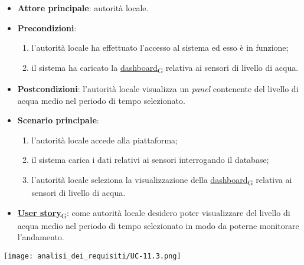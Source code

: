 \begin{itemize}
	\item \textbf{Attore principale}: autorità locale.
	\item \textbf{Precondizioni}:
	      \begin{enumerate}
		      \item l'autorità locale ha effettuato l'accesso al sistema ed esso è in funzione;
		      \item il sistema ha caricato la \href{https://7last.github.io/docs/rtb/documentazione-interna/glossario\#dashboard}{dashboard\textsubscript{G}} relativa ai sensori di livello di acqua.
	      \end{enumerate}
	\item \textbf{Postcondizioni}: l'autorità locale visualizza un \textit{panel} contenente del livello di acqua medio nel periodo di tempo selezionato.
	\item \textbf{Scenario principale}:
	      \begin{enumerate}
		      \item l'autorità locale accede alla piattaforma;
		      \item il sistema carica i dati relativi ai sensori interrogando il database;
		      \item l'autorità locale seleziona la visualizzazione della \href{https://7last.github.io/docs/rtb/documentazione-interna/glossario\#dashboard}{dashboard\textsubscript{G}} relativa ai sensori di livello di acqua.
	      \end{enumerate}
	\item \href{https://7last.github.io/docs/rtb/documentazione-interna/glossario\#user-story}{\textbf{User story}\textsubscript{G}}:
	      come autorità locale desidero poter visualizzare del livello di acqua medio nel periodo di tempo selezionato
	      in modo da poterne monitorare l'andamento.
\end{itemize}
\begin{center}
	\texttt{[image: analisi\_dei\_requisiti/UC-11.3.png]}
\end{center}

\newpage

